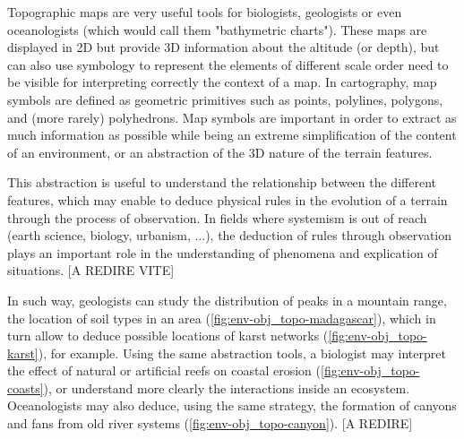 Topographic maps are very useful tools for biologists, geologists or even oceanologists (which would call them "bathymetric charts"). These maps are displayed in 2D but provide 3D information about the altitude (or depth), but can also use symbology to represent the elements of different scale order need to be visible for interpreting correctly the context of a map. In cartography, map symbols are defined as geometric primitives such as points, polylines, polygons, and (more rarely) polyhedrons. Map symbols are important in order to extract as much information as possible while being an extreme simplification of the content of an environment, or an abstraction of the 3D nature of the terrain features. 

This abstraction is useful to understand the relationship between the different features, which may enable to deduce physical rules in the evolution of a terrain through the process of observation. In fields where systemism is out of reach (earth science, biology, urbanism, ...), the deduction of rules through observation plays an important role in the understanding of phenomena and explication of situations. [A REDIRE VITE]

In such way, geologists can study the distribution of peaks in a mountain range, the location of soil types in an area (\cref{fig:env-obj_topo-madagascar}), which in turn allow to deduce possible locations of karst networks (\cref{fig:env-obj_topo-karst}), for example. Using the same abstraction tools, a biologist may interpret the effect of natural or artificial reefs on coastal erosion (\cref{fig:env-obj_topo-coasts}), or understand more clearly the interactions inside an ecosystem. Oceanologists may also deduce, using the same strategy, the formation of canyons and fans from old river systems (\cref{fig:env-obj_topo-canyon}). [A REDIRE]


